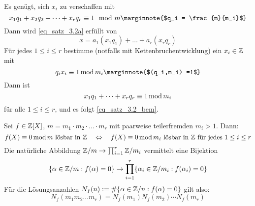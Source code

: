 	Es genügt, sich $x_i$ zu verschaffen mit
	\begin{equation}
		x_1q_1 + x_2q_2 + \dots + x_rq_r \kon 1 \mod m \marginnote{$q_i = \frac{m}{m_i}$} \label{eq_satz_3.2_bem}
	\end{equation}
	Dann wird \eqref{eq_satz_3.2a} erfüllt von
	\[x = a_1(x_1q_1) + \dots + a_r(x_rq_r) \]
	Für jedes $1 \leq i \leq r$ bestimme (notfalls mit Kettenbruchentwicklung) ein $x_i \in \mathbb{Z}$ mit
	\[ q_i x_i \kon 1 \modu m_i \marginnote{$(q_i,m_i) =1$} \]
	Dann ist 
	\[ x_1q_1 + \dots + x_rq_r \equiv 1 \operatorname{mod} m_i\]
	für alle $1 \leq i \leq r$, und es folgt \eqref{eq_satz_3.2_bem}.
	
	Sei $f \in \mathbb{Z}[X]$, $m = m_1\cdot m_2 \cdot \dots \cdot m_r$ mit paarweise teilerfremden $m_i > 1$. Dann: 
	\[f(X) \equiv 0 \operatorname{mod} m \text{ lösbar in } \mathbb{Z} \quad \Leftrightarrow \quad f(X) \equiv 0 \operatorname{mod} m_i \text{ lösbar in } \mathbb{Z} \text{ für jedes } 1 \leq i \leq r \]
	Die natürliche Abbildung $\mathbb{Z}/m \rightarrow \prod_{i=1}^{r} \mathbb{Z}/m_i$ vermittelt eine Bijektion
	\[ \{\alpha \in \mathbb{Z}/m : f(\alpha) = 0\} \rightarrow \prod_{i=1}^{r} \{ \alpha_i \in \mathbb{Z}/m_i : f(\alpha_i) = 0 \} \]
	Für die Lösungsanzahlen $N_f(n) := \# \{\alpha \in \mathbb{Z}/n : f(\alpha) = 0 \}$ gilt also:
	\[N_f(m_1m_2\dots m_r) = N_f(m_1) N_f(m_2) \cdots N_f(m_r) \]
\newpage